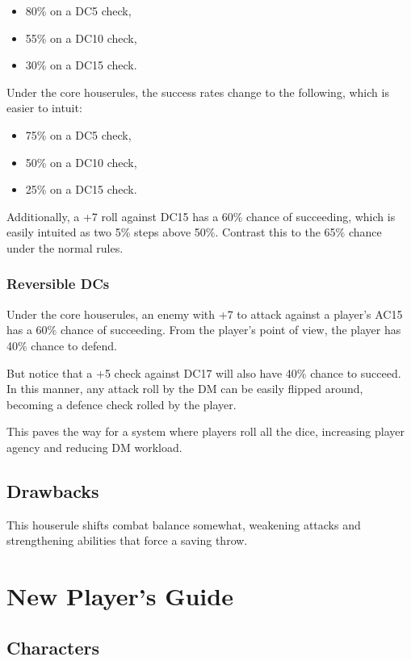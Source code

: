\documentclass[letterpaper,twocolumn,openany,nodeprecatedcode,bg=print]{dndbook}
\begin{document}
\begin{itemize}
\item 80\% on a DC5 check,
\item 55\% on a DC10 check,
\item 30\% on a DC15 check.
\end{itemize}

\noindent Under the core houserules, the success rates change to the following, which is easier to intuit:

\begin{itemize}
\item 75\% on a DC5 check,
\item 50\% on a DC10 check,
\item 25\% on a DC15 check.
\end{itemize}

\noindent Additionally, a +7 roll against DC15 has a 60\% chance of succeeding, which is easily intuited as two 5\% steps above 50\%. 
Contrast this to the 65\% chance under the normal rules.

\subsection{Reversible DCs}
Under the core houserules, an enemy with +7 to attack against a player's AC15 has a 60\% chance of succeeding. 
From the player's point of view, the player has 40\% chance to defend. 

But notice that a +5 check against DC17 will also have 40\% chance to succeed. 
In this manner, any attack roll by the DM can be easily flipped around, becoming a defence check rolled by the player.

This paves the way for a system where players roll all the dice, increasing player agency and reducing DM workload.

\section{Drawbacks}
This houserule shifts combat balance somewhat, weakening attacks and strengthening abilities that force a saving throw. 





\chapter{New Player's Guide}
\label{new-players-guide}

\newpage
\section{Characters}
\end{document}

